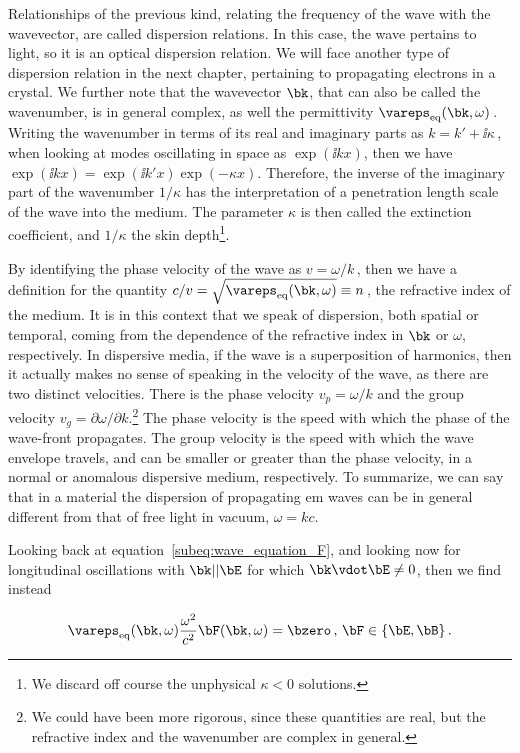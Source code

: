 Relationships of the previous kind, relating the frequency of the wave with the wavevector, are called dispersion relations.
In this case, the wave pertains to light, so it is an optical dispersion relation.
We will face another type of dispersion relation in the next chapter, pertaining to propagating electrons in a crystal.
We further note that the wavevector $\bk$, that can also be called the wavenumber, is in general complex, as well the permittivity $\vareps_{\text{eq}}(\bk,\omega)$\,.
Writing the wavenumber in terms of its real and imaginary parts as $k = k' + \ii \kappa$\,, when looking at modes oscillating in space as $\exp (\ii k x)$, then we have $\exp (\ii k x) = \exp (\ii k' x) \exp (- \kappa x)$.
Therefore, the inverse of the imaginary part of the wavenumber $1/\kappa$ has the interpretation of a penetration length scale of the wave into the medium.
The parameter $\kappa$ is then called the extinction coefficient, and $1/\kappa$ the skin depth\footnote{We discard off course the unphysical $\kappa<0$ solutions.}.

By identifying the phase velocity of the wave as $v = \omega/k$\,, then we have a definition for the quantity $c/v = \sqrt{\vareps_{\text{eq}} (\bk,\omega)} \equiv n$\,, the refractive index of the medium.
It is in this context that we speak of dispersion, both spatial or temporal, coming from the dependence of the refractive index in $\bk$ or $\omega$, respectively.
In dispersive media, if the wave is a superposition of harmonics, then it actually makes no sense of speaking in the velocity of the wave, as there are two distinct velocities.
There is the phase velocity $v_p = \omega/k$ and the group velocity $v_g = \partial \omega/\partial k$.\footnote{We could have been more rigorous, since these quantities are real, but the refractive index and the wavenumber are complex in general.}
The phase velocity is the speed with which the phase of the wave-front propagates.
The group velocity is the speed with which the wave envelope travels, and can be smaller or greater than the phase velocity, in a normal or anomalous dispersive medium, respectively.
To summarize, we can say that in a material the dispersion of propagating \gls{em} waves can be in general different from that of free light in vacuum, $\omega = k c$.

Looking back at equation~\eqref{subeq:wave_equation_F}, and looking now for longitudinal oscillations with $\bk || \bE$ for which $\bk \vdot \bE \neq 0$, then we find instead

\begin{equation}
    \vareps_{\text{eq}}(\bk,\omega) \frac{\omega^2}{c^2} \bF(\bk,\omega) = \bzero\,,\, \bF \in \{\bE, \bB\}\,.
\end{equation}

